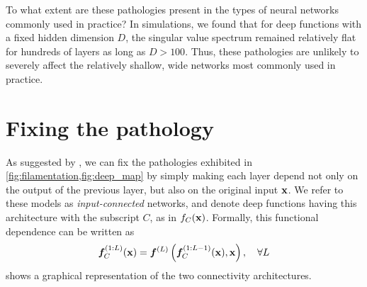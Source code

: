 To what extent are these pathologies present in the types of neural networks commonly used in practice?
In simulations, we found that for deep functions with a fixed hidden dimension $D$, the singular value spectrum remained relatively flat for hundreds of layers as long as $D > 100$.
Thus, these pathologies are unlikely to severely affect the relatively shallow, wide networks most commonly used in practice.





\section{Fixing the pathology}
\label{sec:fix}

As suggested by \citet[chapter 2]{neal1995bayesian}, we can fix the pathologies exhibited in \cref{fig:filamentation,fig:deep_map} by simply making each layer depend not only on the output of the previous layer, but also on the original input ${\bf{x}}$.  
We refer to these models as \emph{input-connected} networks, and denote deep functions having this architecture with the subscript $C$, as in $f_C({\bf{x}})$.
Formally, this functional dependence can be written as
\begin{align}
\boldsymbol{f}_C^{(1:L)}({\bf{x}}) = \boldsymbol{f}^{(L)} \left( \boldsymbol{f}_C^{(1:L-1)}({\bf{x}}), {\bf{x}} \right), \quad \forall L
\end{align}
%
 shows a graphical representation of the two connectivity architectures.

